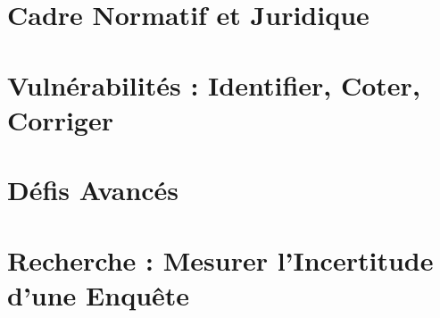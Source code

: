 \documentclass[12pt, twoside, openright, a4paper]{book}
\begin{document}
    \part{Cadre Normatif et Juridique}
    \label{part:normatif}

        

    \part{Vulnérabilités : Identifier, Coter, Corriger}
    \label{part:vulnerabilites}

        
        
        
        

    \part{Défis Avancés}
    \label{part:avance}

        
        
        

    \part{Recherche : Mesurer l'Incertitude d'une Enquête}
    \label{part:recherche}

        

\appendix

    
    
    
    
    
    

\backmatter
\end{document}
